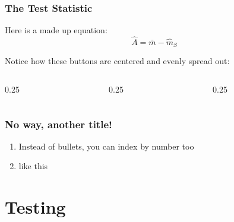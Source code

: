 \documentclass[
    11pt, %
    aspectratio=169, %
]{beamer}
\begin{document}
\begin{frame}
\label{Test Stat}
	\frametitle{The Test Statistic}
		
        Here is a made up equation:
        $$ \hat{A} = \bar{m}-\hat{m}_S$$ \newline

        Notice how these buttons are centered and evenly spread out:\newline

        \begin{columns}[t] %
		\begin{column}{0.25\textwidth} %
                \hyperlink{Terms}{}
		\end{column}
  		\begin{column}{0.25\textwidth} %
                \hyperlink{Definitions}{}
		\end{column}
            \begin{column}{0.25\textwidth} %
                \hyperlink{Theorems}{}
		\end{column}
	\end{columns}
        
\end{frame}

\begin{frame}
	\frametitle{No way, another title!}
            \begin{enumerate}
                \item Instead of bullets, you can index by number too\newline
                \item like this
            \end{enumerate}
\end{frame}

\section{Testing}
\end{document}
